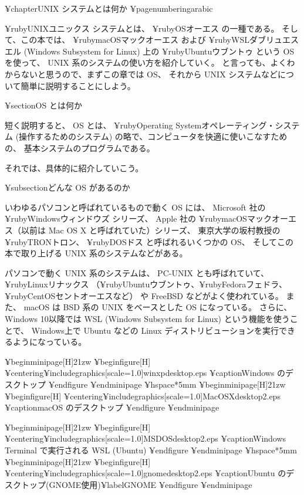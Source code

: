 ¥chapter{UNIX システムとは何か}
¥pagenumbering{arabic}

¥ruby{UNIX}{ユニックス} システムとは、 ¥ruby{OS}{オーエス} の一種である。
そして、この本では、 ¥ruby{macOS}{マックオーエス} および ¥ruby{WSL}{ダブリュエスエル}
(Windows Subsystem for Linux) 上の ¥ruby{Ubuntu}{ウブントゥ} という
 OS を使って、 UNIX 系のシステムの使い方を紹介していく。
と言っても、よくわからないと思うので、まずこの章では OS、
それから UNIX システムなどについて簡単に説明することにしよう。

¥section{OS とは何か}

短く説明すると、 OS とは、 ¥ruby{Operating System}{オペレーティング・システム}
(操作するためのシステム) の略で、コンピュータを快適に使いこなすための、
基本システムのプログラムである。

それでは、具体的に紹介していこう。

¥subsection{どんな OS があるのか}

いわゆるパソコンと呼ばれているもので動く OS には、
 Microsoft 社の ¥ruby{Windows}{ウィンドウズ} シリーズ、
 Apple 社の ¥ruby{macOS}{マックオーエス}（以前は Mac OS X と呼ばれていた）シリーズ、
東京大学の坂村教授の ¥ruby{TRON}{トロン}、
 ¥ruby{DOS}{ドス} と呼ばれるいくつかの OS、
そしてこの本で取り上げる UNIX 系のシステムなどがある。

パソコンで動く UNIX 系のシステムは、 PC-UNIX とも呼ばれていて、
 ¥ruby{Linux}{リナックス} （¥ruby{Ubuntu}{ウブントゥ}、¥ruby{Fedora}{フェドラ}、¥ruby{CentOS}{セントオーエス}など）
や FreeBSD などがよく使われている。
また、 macOS は BSD 系の UNIX をベースとした OS になっている。
さらに、Windows 10以降では WSL (Windows Subsystem for Linux) という機能を使うことで、
Windows上で Ubuntu などの Linux ディストリビューションを実行できるようになっている。

¥begin{minipage}[H]{21zw}
¥begin{figure}[H]
¥centering{¥includegraphics[scale=1.0]{winxpdesktop.eps}}
¥caption{Windows のデスクトップ}
¥end{figure}
¥end{minipage}
¥hspace*{5mm}
¥begin{minipage}[H]{21zw}
¥begin{figure}[H]
¥centering{¥includegraphics[scale=1.0]{MacOSXdesktop2.eps}}
¥caption{macOS のデスクトップ}
¥end{figure}
¥end{minipage}

¥begin{minipage}[H]{21zw}
¥begin{figure}[H]
¥centering{¥includegraphics[scale=1.0]{MSDOSdesktop2.eps}}
¥caption{Windows Terminal で実行される WSL (Ubuntu)}
¥end{figure}
¥end{minipage}
¥hspace*{5mm}
¥begin{minipage}[H]{21zw}
¥begin{figure}[H]
¥centering{¥includegraphics[scale=1.0]{gnomedesktop2.eps}}
¥caption{Ubuntu のデスクトップ(GNOME使用)}¥label{GNOME}
¥end{figure}
¥end{minipage}

